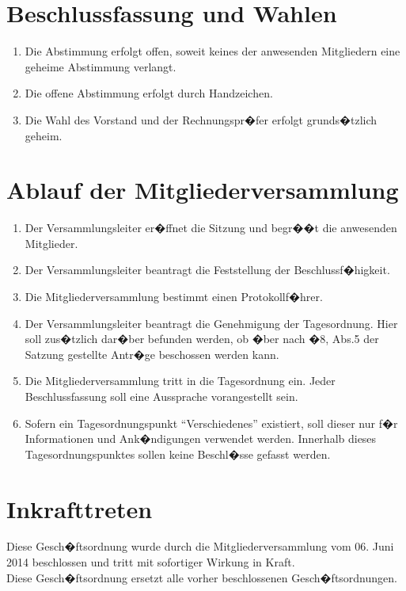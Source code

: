\documentclass[a4paper, 12pt]{scrartcl}
\begin{document}
\section{Beschlussfassung und Wahlen}
\begin{enumerate}
	\item Die Abstimmung erfolgt offen, soweit keines der anwesenden Mitgliedern eine geheime Abstimmung verlangt.
	\item Die offene Abstimmung erfolgt durch Handzeichen.
	\item Die Wahl des Vorstand und der Rechnungspr�fer erfolgt grunds�tzlich geheim.
\end{enumerate}

\section{Ablauf der Mitgliederversammlung}
\begin{enumerate} 
	\item Der Versammlungsleiter er�ffnet die Sitzung und begr��t die anwesenden Mitglieder.
	\item Der Versammlungsleiter beantragt die Feststellung der Beschlussf�higkeit.
	\item Die Mitgliederversammlung bestimmt einen Protokollf�hrer.
	\item Der Versammlungsleiter beantragt die Genehmigung der Tagesordnung. Hier soll zus�tzlich dar�ber befunden werden, ob �ber nach �8, Abs.5 der Satzung gestellte Antr�ge beschossen werden kann.
	\item Die Mitgliederversammlung tritt in die Tagesordnung ein. Jeder Beschlussfassung soll eine Aussprache vorangestellt sein.
	\item Sofern ein Tagesordnungspunkt "`Verschiedenes"' existiert, soll dieser nur f�r Informationen und Ank�ndigungen verwendet werden. Innerhalb dieses Tagesordnungspunktes sollen keine Beschl�sse gefasst werden.
\end{enumerate}

\section{Inkrafttreten}
Diese Gesch�ftsordnung wurde durch die Mitgliederversammlung vom 06. Juni 2014 beschlossen und tritt mit sofortiger Wirkung in Kraft.\\
Diese Gesch�ftsordnung ersetzt alle vorher beschlossenen Gesch�ftsordnungen.
\end{document}
